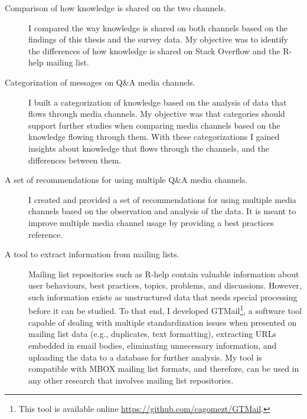 \documentclass{sig-alternate-05-2015}
\begin{document}
	\begin{description}
		\item[Comparison of how knowledge is shared on the two channels.]

		I compared the way knowledge is shared on both channels based on the findings of this thesis and the survey data.
		My objective was to identify the differences of how knowledge is shared on Stack Overflow and the R-help mailing list.

		\item[Categorization of messages on Q\&A media channels.]

		I built a categorization of knowledge based on the analysis of data that flows through media channels. 
		My objective was that categories should support further studies when comparing media channels based on the knowledge flowing through them.
		With these categorizations I gained insights about knowledge that flows through the channels, and the differences between them.

		\item[A set of recommendations for using multiple Q\&A media channels.]

		I created and provided a set of recommendations for using multiple media channels based on the observation and analysis of the data.
		It is meant to improve multiple media channel usage by providing a best practices reference.	

		\item[A tool to extract information from mailing lists.]

		Mailing list repositories such as R-help contain valuable information about user behaviours, best practices, topics, problems, and discussions.
		However, such information exists as unstructured data that needs special processing before it can be studied.
		To that end, I developed GTMail\footnote{This tool is available online \url{https://github.com/cagomezt/GTMail}.}, a software tool capable of dealing with multiple standardization issues when presented on mailing list data (e.g., duplicates, text formatting), extracting URLs embedded in email bodies, eliminating unnecessary information, and uploading the data to a database for further analysis.
		My tool is compatible with MBOX mailing list formats, and therefore, can be used in any other research that involves mailing list repositories.
	\end{description}
\end{document}

